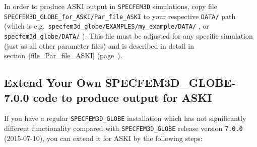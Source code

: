 \documentclass[12pt,a4paper]{article}
\newcommand{\lcode}[1]{\nolinkurl{#1}}
\newcommand{\lcodetitle}[1]{ {\ttfamily #1} }
\newcommand{\ASKI}{ {\ttfamily ASKI} }
\newcommand{\myref}[1]{\ref{#1} (page~\pageref{#1})}
\begin{document}
In order to produce \ASKI{} output in \lcode{SPECFEM3D} simulations, copy file 
\lcode{SPECFEM3D_GLOBE_for_ASKI/Par_file_ASKI} to your respective \lcode{DATA/} path
(which is e.g.\ \lcode{specfem3d_globe/EXAMPLES/my_example/DATA/} , or \lcode{specfem3d_globe/DATA/} ). This 
file must be adjusted for any specific simulation (just as all other parameter files) and is described in 
detail in section~\myref{file_Par_file_ASKI}.


\subsection{Extend Your Own \lcodetitle{SPECFEM3D\_GLOBE-7.0.0} code to produce output for \ASKI{}} \label{extent_to_ASKI}
If you have a regular \lcode{SPECFEM3D_GLOBE} installation which has not significantly
different functionality compared with \lcode{SPECFEM3D_GLOBE} release version \lcode{7.0.0}
(2015-07-10), you can extend it for \ASKI{} by the following steps:
\end{document}
